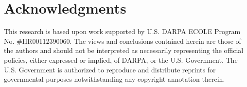 \section*{Acknowledgments}

This research is based upon work supported by U.S. DARPA ECOLE Program No. \#HR00112390060. The views and conclusions contained herein are those of the authors and should not be interpreted as necessarily representing the official policies, either expressed or implied, of DARPA, or the U.S. Government. The U.S. Government is authorized to reproduce and distribute reprints for governmental purposes notwithstanding any copyright annotation therein.
